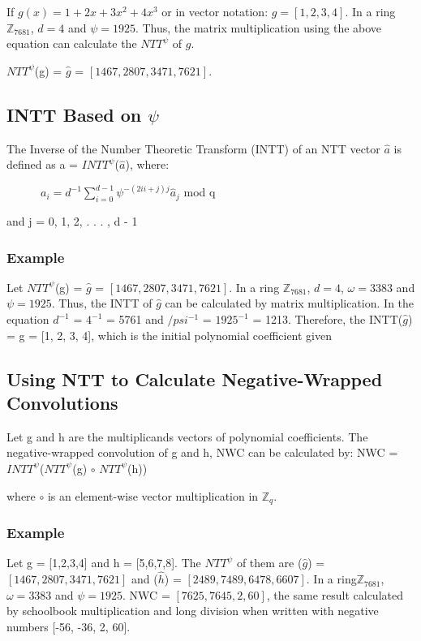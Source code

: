 \documentclass{techrep}
\theoremstyle{definition}
\theoremstyle{plain}
\newcommand{\Z}{\mathbb{Z}}
\begin{document}
	If $g(x) = 1 + 2x + 3x^2 + 4x^3$ or in vector notation:  $g = [1, 2, 3, 4]$.
	In a ring $\Z_{7681}$, $d = 4$ and $\psi =1925$. Thus, the matrix multiplication using the above equation can calculate the ${NTT}^\psi$ of $g$.

	${NTT}^\psi$(g) = $\hat{g}$ = $[1467, 2807, 3471, 7621]$.

	\subsection{INTT Based on $\psi$}
	The Inverse of the Number Theoretic Transform (INTT) of an NTT vector $\hat{a}$ is defined as a = ${INTT}^\psi$($\hat{a}$), where:

	$\quad \quad \quad a_i = d^{-1}\sum_{i=0}^{d - 1}\psi^{-(2ii+j)j}\hat{a}_j$ mod q

	and j = 0, 1, 2, . . . , d - 1

	\subsubsection{Example}

	Let ${NTT}^\psi$(g) = $\hat{g}$ = $[1467,2807,3471,7621]$. In a ring $\Z_{7681}$, $d = 4$, $\omega =3383$ and $\psi =1925$. Thus, the INTT of $\hat{g}$ can be calculated by matrix multiplication. In the equation $d^{-1}$ = $4^{-1}$ = 5761 and $/psi^{-1}$ = ${1925}^{-1}$ = 1213. Therefore, the INTT($\hat{g}$) = g = [1, 2, 3, 4], which is the initial polynomial coefficient given

	\subsection{Using NTT to Calculate Negative-Wrapped Convolutions}

	Let g and h are the multiplicands vectors of polynomial coefficients. The negative-wrapped convolution of g and h, NWC can be calculated by:
	NWC = ${INTT}^\psi$(${NTT}^\psi$(g) $\circ$ ${NTT}^\psi$(h))

	where $\circ$ is an element-wise vector multiplication in $\Z_{q}$.

	\subsubsection{Example}
	Let g = [1,2,3,4] and h = [5,6,7,8]. The ${NTT}^\psi$ of them are ($\hat{g}$) = $[1467,2807,3471,7621]$ and ($\hat{h}$) = $[2489,7489,6478,6607]$. In a ring$\Z_{7681}$, $\omega =3383$ and $\psi =1925$. NWC = $[7625, 7645, 2, 60]$, the same result calculated by schoolbook multiplication and long division when written with negative numbers [-56, -36, 2, 60].
\end{document}
